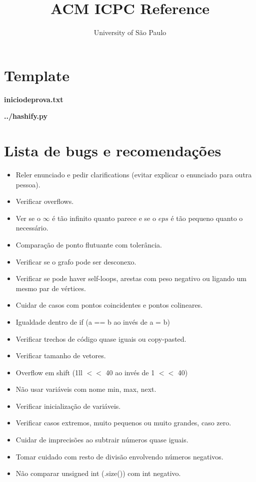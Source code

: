\documentclass[a4paper,oneside,twocolumn]{article}
\title{ACM ICPC Reference}
\author{University of São Paulo}
\newcommand{\sourcefile}[1]{\begin{center}\textbf{#1}\end{center}}
\newcommand{\Csourcefile}[1]{}
\begin{document}
\scriptsize{}
\maketitle
\thispagestyle{fancy}


\tableofcontents


\newpage

\section{Template} {
  \sourcefile{iniciodeprova.txt}
  \Csourcefile{hashed/template}
  \sourcefile{../hashify.py}
}
\section{Lista de bugs e recomendações} {
  \begin{itemize} \itemsep1pt \parskip0pt 
  \item Reler enunciado e pedir clarifications (evitar explicar o enunciado para outra pessoa).
  \item Verificar overflows.
  \item Ver se o $\infty$ é tão infinito quanto parece e se o $eps$ é tão pequeno quanto o necessário.
  \item Comparação de ponto flutuante com tolerância.
  \item Verificar se o grafo pode ser desconexo.
  \item Verificar se pode haver self-loops, arestas com peso negativo ou ligando um mesmo par de vértices.
  \item Cuidar de casos com pontos coincidentes e pontos colineares.
  \item Igualdade dentro de if (a == b ao invés de a = b)
  \item Verificar trechos de código quase iguais ou copy-pasted.
  \item Verificar tamanho de vetores.
  \item Overflow em shift (1ll $<<$ 40 ao invés de 1 $<<$ 40)
  \item Não usar variáveis com nome min, max, next.
  \item Verificar inicialização de variáveis.
  \item Verificar casos extremos, muito pequenos ou muito grandes, caso zero.
  \item Cuidar de imprecisões ao subtrair números quase iguais.
  \item Tomar cuidado com resto de divisão envolvendo números negativos.
  \item Não comparar unsigned int (.size()) com int negativo.
  \end{itemize}
}
  
\end{document}
